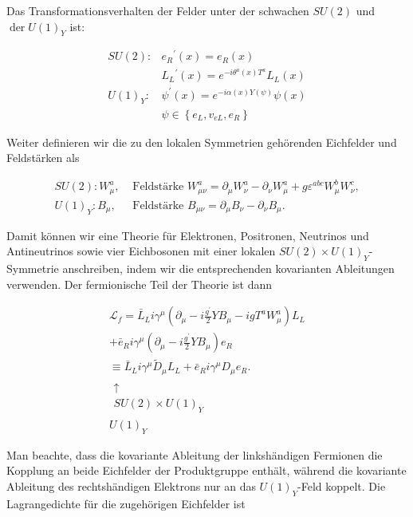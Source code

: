 \documentclass[10pt, letterpaper]{article}
\begin{document}
Das Transformationsverhalten der Felder unter der schwachen $S U(2)$ und $\operatorname{der} U(1)_{Y}$ ist:

$$
\begin{aligned}
S U(2): & e_{R}{ }^{\prime}(x)=e_{R}(x) \\
& L_{L}{ }^{\prime}(x)=e^{-i \theta^{a}(x) T^{a}} L_{L}(x) \\
U(1)_{Y}: & \psi^{\prime}(x)=e^{-i \alpha(x) Y(\psi)} \psi(x) \\
& \psi \in\left\{e_{L}, v_{e L}, e_{R}\right\}
\end{aligned}
$$

Weiter definieren wir die zu den lokalen Symmetrien gehörenden Eichfelder und Feldstärken als

$$
\begin{array}{ll}
S U(2): W_{\mu}^{a}, & \text { Feldstärke } W_{\mu \nu}^{a}=\partial_{\mu} W_{\nu}^{a}-\partial_{\nu} W_{\mu}^{a}+g \varepsilon^{a b c} W_{\mu}^{b} W_{\nu}^{c}, \\
U(1)_{Y}: B_{\mu}, & \text { Feldstärke } B_{\mu \nu}=\partial_{\mu} B_{\nu}-\partial_{\nu} B_{\mu} .
\end{array}
$$

Damit können wir eine Theorie für Elektronen, Positronen, Neutrinos und Antineutrinos sowie vier Eichbosonen mit einer lokalen $S U(2) \times U(1)_{Y}$-Symmetrie anschreiben, indem wir die entsprechenden kovarianten Ableitungen verwenden. Der fermionische Teil der Theorie ist dann

$$
\begin{gathered}
\mathscr{L}_{f}=\bar{L}_{L} i \gamma^{\mu}\left(\partial_{\mu}-i \frac{g^{\prime}}{2} Y B_{\mu}-i g T^{a} W_{\mu}^{a}\right) L_{L} \\
+\bar{e}_{R} i \gamma^{\mu}\left(\partial_{\mu}-i \frac{g^{\prime}}{2} Y B_{\mu}\right) e_{R} \\
\equiv \bar{L}_{L} i \gamma^{\mu} \tilde{D}_{\mu} L_{L}+\bar{e}_{R} i \gamma^{\mu} D_{\mu} e_{R} . \\
\substack{\uparrow \\
S U(2) \times U(1)_{Y}} \\
U(1)_{Y}
\end{gathered}
$$

Man beachte, dass die kovariante Ableitung der linkshändigen Fermionen die Kopplung an beide Eichfelder der Produktgruppe enthält, während die kovariante Ableitung des rechtshändigen Elektrons nur an das $U(1)_{Y}$-Feld koppelt. Die Lagrangedichte für die zugehörigen Eichfelder ist
\end{document}
